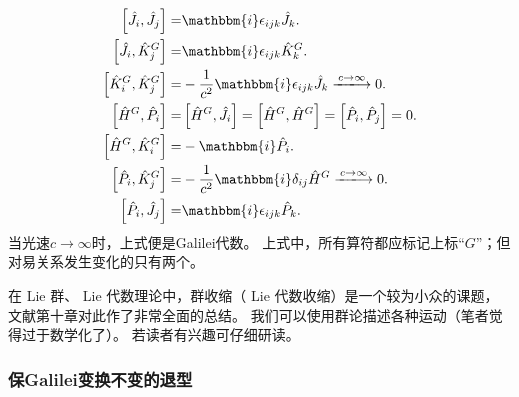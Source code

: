 \begin{subequations}
    \begin{align}
        \left[\hat{J}_i, \hat{J}_j \right] =& \mathbbm{i} \epsilon_{ijk} \hat{J}_k . \\
        \left[\hat{J}_i, \hat{K}_j^G\right] =& \mathbbm{i} \epsilon_{ijk} \hat{K}_k ^G. \\
        \left[\hat{K}_i^G, \hat{K}_j^G\right] =& -\frac{1}{c^2}\mathbbm{i}\epsilon_{ijk} \hat{J}_k 
        \xlongrightarrow{c\to \infty} 0. \\
        \left[\hat{H}^G, \hat{P}_i \right] =& \left[\hat{H}^G, \hat{J}_i \right]
        =\left[\hat{H}^G, \hat{H}^G \right] =\left[\hat{P}_i, \hat{P}_j \right] =0 . \\
        \left[\hat{H}^G, \hat{K}^G_i \right] = & -\mathbbm{i} \hat{P}_i .\\
        \left[\hat{P}_i, \hat{K}^G_j \right] =& -\frac{1}{c^2}\mathbbm{i} \delta_{ij} \hat{H}^G 
        \xlongrightarrow{c\to \infty} 0.\\
        \left[\hat{P}_i, \hat{J}_j \right] =& \mathbbm{i} \epsilon_{ijk} \hat{P}_k .
    \end{align}
\end{subequations}
当光速$c\to \infty$时，上式便是Galilei代数。
上式中，所有算符都应标记上标“$G$”；但对易关系发生变化的只有两个。

在 Lie 群、 Lie 代数理论中，群收缩（ Lie 代数收缩）是一个较为小众的课题，
文献\parencite{Gilmore-1974}第十章对此作了非常全面的总结。
我们可以使用群论描述各种运动\cite{McRae-2007}（笔者觉得过于数学化了）。
若读者有兴趣可仔细研读。

\subsubsection{保Galilei变换不变的退型}\label{chlg:sec_Galilei-metric}

